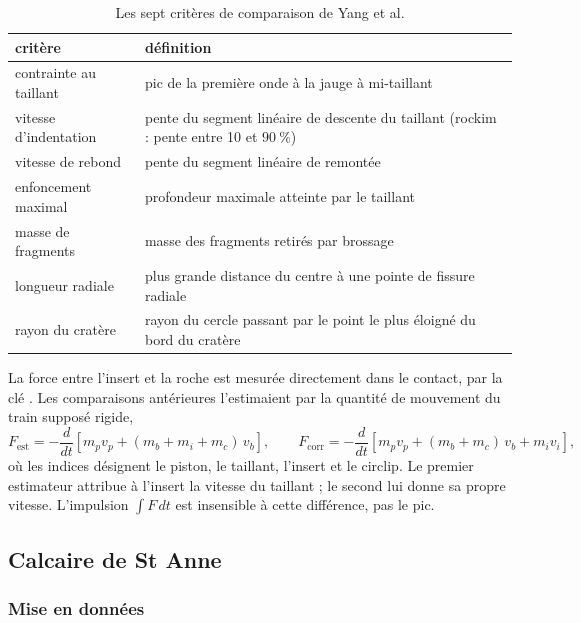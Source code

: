 \begin{table}[htbp]
\centering
\caption{Les sept critères de comparaison de Yang et al.}
\label{tab-criteres}
\small
\begin{tabularx}{\linewidth}{@{}l X@{}}
\toprule
critère & définition \\
\midrule
contrainte au taillant & pic de la première onde à la jauge à mi-taillant \\
vitesse d'indentation & pente du segment linéaire de descente du taillant (rockim : pente entre 10 et $90~\%$) \\
vitesse de rebond & pente du segment linéaire de remontée \\
enfoncement maximal & profondeur maximale atteinte par le taillant \\
masse de fragments & masse des fragments retirés par brossage \\
longueur radiale & plus grande distance du centre à une pointe de fissure radiale \\
rayon du cratère & rayon du cercle passant par le point le plus éloigné du bord du cratère \\
\bottomrule
\end{tabularx}
\end{table}

La force entre l'insert et la roche est mesurée directement dans le contact, par la clé . Les comparaisons antérieures l'estimaient par la quantité de mouvement du train supposé rigide,
\begin{equation}
F_\text{est} = -\frac{d}{dt}\left[m_p v_p + (m_b + m_i + m_c)\,v_b\right], \qquad
F_\text{corr} = -\frac{d}{dt}\left[m_p v_p + (m_b + m_c)\,v_b + m_i v_i\right],
\label{eq-estimateur}
\end{equation}
où les indices désignent le piston, le taillant, l'insert et le circlip. Le premier estimateur attribue à l'insert la vitesse du taillant ; le second lui donne sa propre vitesse. L'impulsion $\int F\,dt$ est insensible à cette différence, pas le pic.

\subsection{Calcaire de St Anne}
\label{sec-stanne}

\subsubsection{Mise en données}

